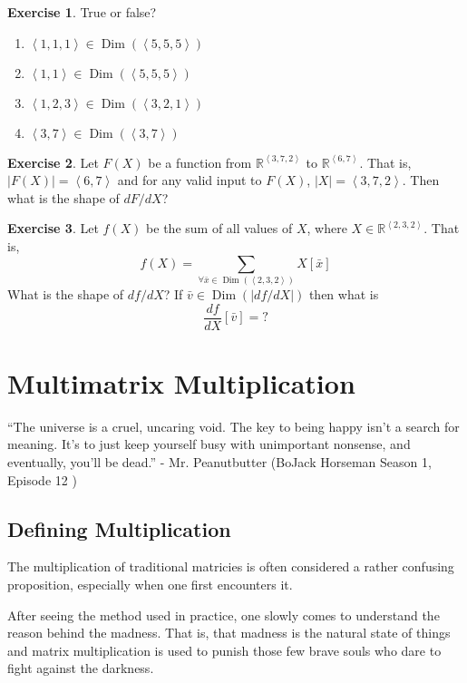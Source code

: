 \documentclass[12pt]{book}
\theoremstyle{plain}
\theoremstyle{definition}
\newtheorem{exercise}{Exercise}[chapter]
\theoremstyle{ppart}
\theoremstyle{case}
\theoremstyle{solution}
\DeclareMathOperator{\Dim}{Dim}
\newcommand{\shape}[1]{\left|#1\right|}
\begin{document}
\begin{exercise}
True or false?
\begin{enumerate}
\item $\left<1,1,1\right> \in \Dim(\left<5,5,5\right>)$
\item $\left<1,1\right> \in \Dim(\left<5,5,5\right>)$
\item $\left<1,2,3\right> \in \Dim(\left<3,2,1\right>)$
\item $\left<3,7\right> \in \Dim(\left<3,7\right>)$
\end{enumerate}
\end{exercise}

\begin{exercise}
Let $F(X)$ be a function from $\mathbb{R}^{\left<3,7,2\right>}$ to
$\mathbb{R}^{\left<6, 7\right>}$. That is, $\shape{F(X)} = \left<6,7\right>$
and for any valid input to $F(X)$, $\shape{X} = \left<3,7,2\right>$.
Then what is the shape of $dF/dX$?
\end{exercise}

\begin{exercise}
Let $f(X)$ be the sum of all values of $X$, where
$X \in \mathbb{R}^{\left<2,3,2\right>}$. That is,
\[ f(X) = \sum_{\forall \bar{x} \in \Dim(\left<2,3,2\right>)} X[\bar{x}] \]
What is the shape of $df/dX$? If $\bar{v} \in \Dim(\shape{df/dX})$ then what is
\[ \frac{df}{dX}[\bar{v}] = ? \]
\end{exercise}

\chapter{Multimatrix Multiplication}

\begin{displayquote}
``The universe is a cruel, uncaring void. The key to being happy isn't a search
for meaning. It's to just keep yourself busy with unimportant nonsense, and eventually,
you'll be dead.'' - Mr. Peanutbutter (BoJack Horseman Season 1, Episode 12
\cite{bojack})
\end{displayquote}

\section{Defining Multiplication}

The multiplication of traditional matricies is often considered a rather confusing
proposition, especially when one first encounters it.

After seeing the method used in practice, one slowly comes to understand the
reason behind the madness. That is, that madness is the natural state of things
and matrix multiplication is used to punish those few brave souls who dare to
fight against the darkness.
\end{document}
